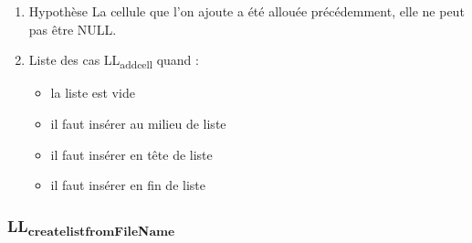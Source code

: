 \documentclass[11pt]{article}
\begin{document}
\begin{enumerate}
\item Hypothèse
\label{sec:org2085350}
La cellule que l'on ajoute a été allouée précédemment, elle ne peut pas être NULL.
\item Liste des cas
\label{sec:orgb117f66}
LL\textsubscript{add}\textsubscript{cell} quand :
\begin{itemize}
\item la liste est vide
\item il faut insérer au milieu de liste
\item il faut insérer en tête de liste
\item il faut insérer en fin de liste
\end{itemize}
\end{enumerate}

\subsubsection{LL\textsubscript{create}\textsubscript{list}\textsubscript{fromFileName}}
\label{sec:orgf80d280}
\end{document}

